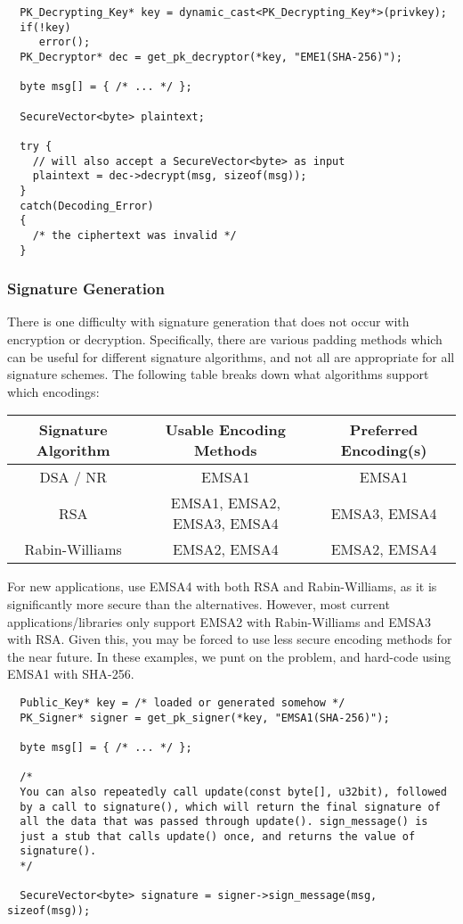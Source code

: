 \documentclass{article}
\begin{document}
\begin{verbatim}
  PK_Decrypting_Key* key = dynamic_cast<PK_Decrypting_Key*>(privkey);
  if(!key)
     error();
  PK_Decryptor* dec = get_pk_decryptor(*key, "EME1(SHA-256)");

  byte msg[] = { /* ... */ };

  SecureVector<byte> plaintext;

  try {
    // will also accept a SecureVector<byte> as input
    plaintext = dec->decrypt(msg, sizeof(msg));
  }
  catch(Decoding_Error)
  {
    /* the ciphertext was invalid */
  }
\end{verbatim}

\subsubsection{Signature Generation}

There is one difficulty with signature generation that does not occur with
encryption or decryption. Specifically, there are various padding methods which
can be useful for different signature algorithms, and not all are appropriate
for all signature schemes. The following table breaks down what algorithms
support which encodings:

\begin{tabular}{|c|c|c|} \hline
Signature Algorithm & Usable Encoding Methods & Preferred Encoding(s) \\ \hline
DSA / NR            & EMSA1                   & EMSA1 \\ \hline
RSA                 & EMSA1, EMSA2, EMSA3, EMSA4 & EMSA3, EMSA4 \\ \hline
Rabin-Williams      & EMSA2, EMSA4            & EMSA2, EMSA4 \\ \hline
\end{tabular}

For new applications, use EMSA4 with both RSA and Rabin-Williams, as it is
significantly more secure than the alternatives. However, most current
applications/libraries only support EMSA2 with Rabin-Williams and EMSA3 with
RSA. Given this, you may be forced to use less secure encoding methods for the
near future. In these examples, we punt on the problem, and hard-code using
EMSA1 with SHA-256.

\begin{verbatim}
  Public_Key* key = /* loaded or generated somehow */
  PK_Signer* signer = get_pk_signer(*key, "EMSA1(SHA-256)");

  byte msg[] = { /* ... */ };

  /*
  You can also repeatedly call update(const byte[], u32bit), followed
  by a call to signature(), which will return the final signature of
  all the data that was passed through update(). sign_message() is
  just a stub that calls update() once, and returns the value of
  signature().
  */

  SecureVector<byte> signature = signer->sign_message(msg, sizeof(msg));
\end{verbatim}
\end{document}
